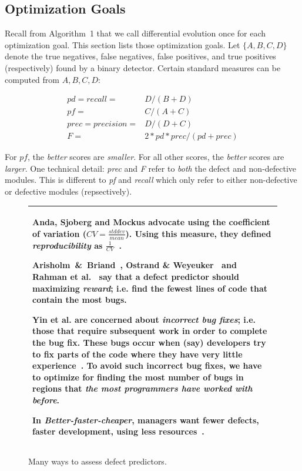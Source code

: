 \documentclass{sig-alternative}
\begin{document}
\subsection{Optimization Goals}

Recall from Algorithm~1 that we call differential evolution once for each
 optimization goal. This section lists those optimization goals.
Let $\{A,B,C,D\}$ denote the
true negatives, 
false negatives, 
false positives, and 
true positives
(respectively) found by a binary detector. 
Certain standard measures can be computed from
$A,B,C,D$: 

{\scriptsize\[
\begin{array}{ll}
pd=recall=&D/(B+D)\\
pf=&C/(A+C)\\ 
prec=precision=&D/(D+C) \\
F =&2*pd*prec/(pd + prec)
\end{array}
\]}

For $pf$, the {\em better} scores are {\em smaller}.
For all other scores, the {\em better} scores are {\em larger}.
One technical detail:   {\em prec}
and {\em F} refer to {\em both} the defect and non-defective modules. This is different to {\em pf} and {\em recall} which only
refer to either non-defective or defective modules (repsectively).


\begin{figure}[!b]
\small
\begin{tabular}{|p{.95\linewidth}|}\hline

 Anda, Sjoberg and Mockus advocate using the coefficient of variation ($CV=\frac{stddev}{mean}$).
Using this measure, they defined {\em reproducibility} as $\frac{1}{CV}$~\cite{anda09}.

Arisholm~\&~Briand~\cite{arisholm06},  Ostrand \& Weyeuker~\cite{ostrand04} and Rahman et al.~\cite{rahman12}
say that a defect predictor should maximizing {\em reward}; i.e. find the fewest lines of code
that contain the most bugs.

Yin et al. are concerned about
 {\em incorrect bug fixes}; i.e. those that require subsequent work in order to complete the bug fix.
These bugs occur  when (say) developers try to fix parts of the code
where they have very little experience~\cite{yin11}.  To avoid such incorrect bug fixes, we have to optimize
for finding the most number of bugs in regions that {\em the most programmers have worked with before}.

In {\em Better-faster-cheaper},   managers want
 fewer defects,  faster development,  using less resources~\cite{Green,elrawas10,me07f,me09f}.
\\\hline
\end{tabular}
\caption{Many ways to assess defect predictors.}\label{fig:criteria}
\end{figure}
\end{document}
